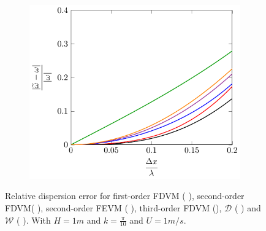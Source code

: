 \begin{figure}
\begin{subfigure}{0.5\textwidth}
		\includegraphics[width=\textwidth]{./chp4/figures/Dispu1khShallz.pdf}
	\end{subfigure}
	\caption{Relative dispersion error for first-order FDVM ({\color{green!60!black} \solidrule}), second-order FDVM({\color{red} \solidrule}), second-order FEVM ({\color{blue} \solidrule}), third-order FDVM ({\solidrule}), $\mathcal{D}$ ({\color{violet!80!white} \solidrule}) and $\mathcal{W}$ ({\color{orange} \solidrule}). With $H = 1m$  and $k = \frac{\pi}{10}$ and $U = 1 m/s$.}
	\label{fig:Dispu1Shall}
\end{figure}

